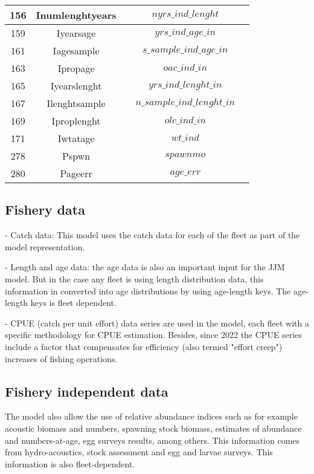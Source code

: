\documentclass{article}
\begin{document}
\begin{tabular}{| c | c | c | c | c |}
\hline
156 & Inumlenghtyears &   & $nyrs\_ind\_lenght$ & \\ \hline
159 & Iyearsage &   & $yrs\_ind\_age\_in$ & \\ \hline
161 & Iagesample &   & $s\_sample\_ind\_age\_in$ & \\ \hline
163 & Ipropage &   & $oac\_ind\_in$ & \\ \hline
165 & Iyearslenght &   & $yrs\_ind\_lenght\_in$ & \\ \hline
167 & Ilenghtsample &   & $n\_sample\_ind\_lenght\_in$ & \\ \hline
169 & Iproplenght &   & $olc\_ind\_in$ & \\ \hline
171 & Iwtatage &   & $wt\_ind$ & \\ \hline
278 & Pspwn &   & $spawnmo$ & \\ \hline
280 & Pageerr &   & $age\_err$ & \\ \hline
\end{tabular} 

\subsection{Fishery data}

- Catch data: This model uses the catch data for each of the fleet as part of the model representation.

- Length and age data: the age data is also an important input for the JJM model. But in the case any fleet is using length distribution data, this information in converted into age distributions by using age-length keys. The age-length keys is fleet dependent.

- CPUE (catch per unit effort) data series are used in the model, each fleet with a specific methodology for CPUE estimation. Besides, since 2022 the CPUE series include a factor that compensates for efficiency (also termed "effort creep") increases of fishing operations.

\subsection{Fishery independent data}

The model also allow the use of relative abundance indices such as for example acoustic biomass and numbers, spawning stock biomass, estimates of abundance and numbers-at-age, egg surveys results, among others. This information comes from hydro-acoustics, stock assessment and egg and larvae surveys. This information is also fleet-dependent.
\end{document}
